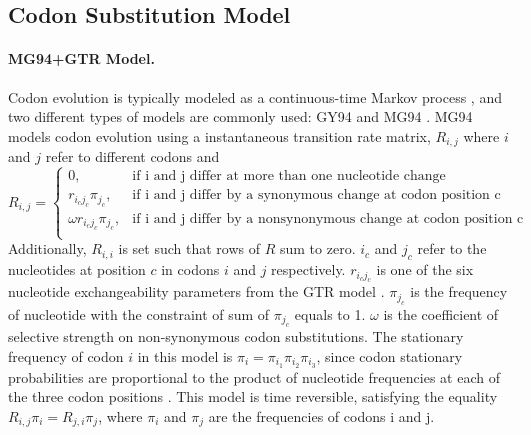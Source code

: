 \subsection{Codon Substitution Model}
\paragraph{MG94+GTR Model.} Codon evolution is typically modeled as a continuous-time Markov process \parencite{rodrigue2008bayesian}, and two different types of models are commonly used: GY94 and MG94 \parencite{muse1994likelihood, goldman1994codon}. MG94 models codon evolution using a instantaneous transition rate matrix, $R_{i,j}$ where $i$ and $j$ refer to different codons and
\[
R_{i,j} = \begin{cases}
                    0, & \text{if i and j differ at more than one nucleotide change}\\
                    r_{{i_c} {j_c}} \pi_{j_c}, & \text{if i and j differ by a synonymous change at codon position c}\\
                    \omega r_{{i_c} {j_c}} \pi_{j_c}, & \text{if i and j differ by a nonsynonymous change at codon position c}\\
          \end{cases}
\]
Additionally, $R_{i,i}$ is set such that rows of $R$ sum to zero. $i_c$ and $j_c$ refer to the nucleotides at position $c$ in codons $i$ and $j$ respectively. $r_{{i_c} {j_c}}$ is one of the six nucleotide exchangeability parameters from the GTR model \parencite{tavare1986some}. $\pi_{j_c}$ is the frequency of nucleotide with the constraint of sum of $\pi_{j_c}$ equals to 1. $\omega$ is the coefficient of selective strength on non-synonymous codon substitutions. The stationary frequency of codon $i$ in this model is $\pi_i = \pi_{i_1}\pi_{i_2}\pi_{i_3}$, since codon stationary probabilities are proportional to the product of nucleotide frequencies at each of the three codon positions \parencite{rodrigue2008bayesian}.
This model is time reversible, satisfying the equality $R_{i,j} \pi_i = R_{j,i} \pi_j$, where $\pi_i$ and  $\pi_j$ are the frequencies of codons i and j.   

